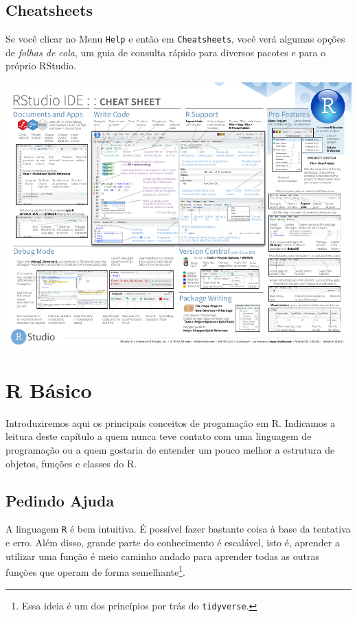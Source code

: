 \documentclass[
]{book}
\begin{document}
\hypertarget{cheatsheets}{%
\section{Cheatsheets}\label{cheatsheets}}

Se você clicar no Menu \texttt{Help} e então em \texttt{Cheatsheets}, você verá algumas opções de \emph{folhas de cola}, um guia de consulta rápido para diversos pacotes e para o próprio RStudio.

\begin{center}\includegraphics[width=11.54in]{img/rstudio/cheatsheet-rstudio} \end{center}

\hypertarget{r-buxe1sico}{%
\chapter{R Básico}\label{r-buxe1sico}}

Introduziremos aqui os principais conceitos de progamação em R. Indicamos a leitura deste capítulo a quem nunca teve contato com uma linguagem de programação ou a quem gostaria de entender um pouco melhor a estrutura de objetos, funções e classes do R.

\hypertarget{pedindo-ajuda}{%
\section{Pedindo Ajuda}\label{pedindo-ajuda}}

A linguagem \texttt{R} é bem intuitiva. É possível fazer bastante coisa à base da tentativa e erro. Além disso, grande parte do conhecimento é escalável, isto é, aprender a utilizar uma função é meio caminho andado para aprender todas as outras funções que operam de forma semelhante\footnote{Essa ideia é um dos princípios por trás do \texttt{tidyverse}.}.
\end{document}
